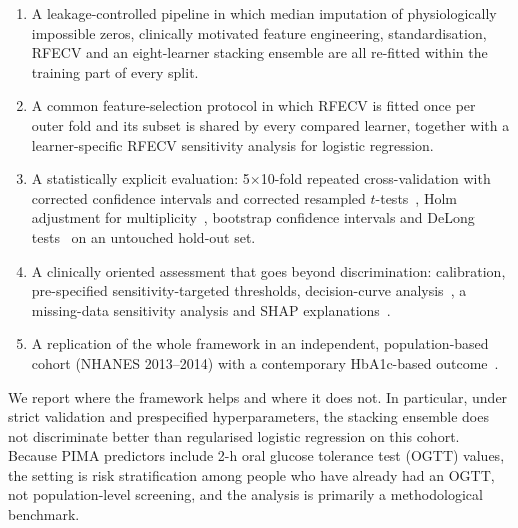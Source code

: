 \begin{enumerate}
  \item A leakage-controlled pipeline in which median imputation of physiologically impossible zeros, clinically motivated feature engineering, standardisation, RFECV and an eight-learner stacking ensemble are all re-fitted within the training part of every split.
  \item A common feature-selection protocol in which RFECV is fitted once per outer fold and its subset is shared by every compared learner, together with a learner-specific RFECV sensitivity analysis for logistic regression.
  \item A statistically explicit evaluation: 5$\times$10-fold repeated cross-validation with corrected confidence intervals and corrected resampled $t$-tests~\cite{nadeau2003inference,bouckaert2004replicability}, Holm adjustment for multiplicity~\cite{holm1979}, bootstrap confidence intervals and DeLong tests~\cite{delong1988,sun2014delong} on an untouched hold-out set.
  \item A clinically oriented assessment that goes beyond discrimination: calibration, pre-specified sensitivity-targeted thresholds, decision-curve analysis~\cite{vickers2006dca}, a missing-data sensitivity analysis and SHAP explanations~\cite{lundberg2017shap}.
  \item A replication of the whole framework in an independent, population-based cohort (NHANES 2013--2014) with a contemporary HbA1c-based outcome~\cite{nhanes2013}.
\end{enumerate}

We report where the framework helps and where it does not. In particular, under strict validation and prespecified hyperparameters, the stacking ensemble does not discriminate better than regularised logistic regression on this cohort. Because PIMA predictors include 2-h oral glucose tolerance test (OGTT) values, the setting is risk stratification among people who have already had an OGTT, not population-level screening, and the analysis is primarily a methodological benchmark.
